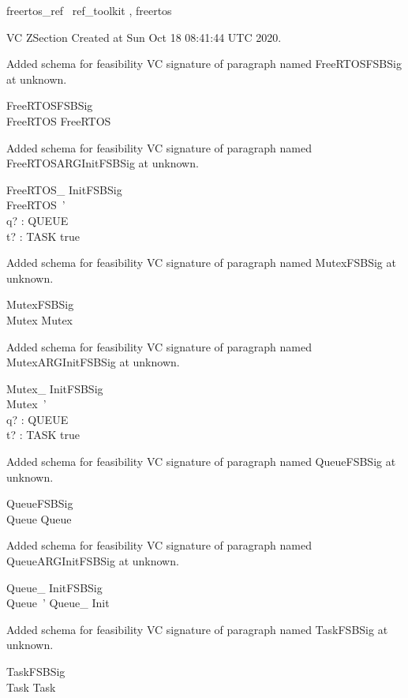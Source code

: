 \documentclass{article}
\begin{document}

\begin{zsection}	 \SECTION freertos\_ref \parents~ref\_toolkit , freertos
\end{zsection}

VC ZSection Created at Sun Oct 18 08:41:44 UTC 2020.


Added schema for feasibility VC signature of paragraph named FreeRTOSFSBSig at unknown.
\begin{schema}{FreeRTOSFSBSig}
\\
 FreeRTOS 
\where
 FreeRTOS
\end{schema}


Added schema for feasibility VC signature of paragraph named FreeRTOSARGInitFSBSig at unknown.
\begin{schema}{FreeRTOS\_ InitFSBSig}
\\
 FreeRTOS~' \\
 q? : QUEUE \\
 t? : TASK 
\where
 true
\end{schema}


Added schema for feasibility VC signature of paragraph named MutexFSBSig at unknown.
\begin{schema}{MutexFSBSig}
\\
 Mutex 
\where
 Mutex
\end{schema}


Added schema for feasibility VC signature of paragraph named MutexARGInitFSBSig at unknown.
\begin{schema}{Mutex\_ InitFSBSig}
\\
 Mutex~' \\
 q? : QUEUE \\
 t? : TASK 
\where
 true
\end{schema}


Added schema for feasibility VC signature of paragraph named QueueFSBSig at unknown.
\begin{schema}{QueueFSBSig}
\\
 Queue 
\where
 Queue
\end{schema}


Added schema for feasibility VC signature of paragraph named QueueARGInitFSBSig at unknown.
\begin{schema}{Queue\_ InitFSBSig}
\\
 Queue~' 
\where
 Queue\_ Init
\end{schema}


Added schema for feasibility VC signature of paragraph named TaskFSBSig at unknown.
\begin{schema}{TaskFSBSig}
\\
 Task 
\where
 Task
\end{schema}
\end{document}
